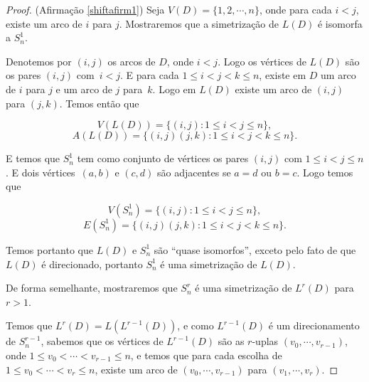 \begin{proof}(Afirmação \ref{shiftafirm1})
Seja $V(D) = \{1,2,\cdots, n\}$, onde para cada $i < j$, existe um arco de $i$ para $j$. Mostraremos que a simetrização de $L(D)$ é isomorfa a $S_n^1$.

Denotemos por $(i,j)$ os arcos de $D$, onde $i < j$. Logo os vértices de $L(D)$ são os pares $(i,j)$ com~$i < j$. E para cada $1 \leq i < j < k \leq n$, existe em $D$ um arco de $i$ para $j$ e um arco de $j$ para~$k$. Logo em $L(D)$ existe um arco de $(i,j)$ para $(j,k)$. Temos então que

\[V(L(D)) = \{(i,j) : 1\leq i < j \leq n\},\]
\[A(L(D)) = \{(i,j)(j,k) : 1\leq i <j<k\leq n\}.\]

E temos que $S_n^1$ tem como conjunto de vértices os pares $(i,j)$ com $1\leq i<j\leq n$. E dois vértices~$(a,b)$ e $(c,d)$ são adjacentes se $a = d$ ou $b = c$. Logo temos que

\[V(S_n^1) = \{(i,j) : 1\leq i<j\leq n\},\]
\[E(S_n^1) = \{(i,j)(j,k) : 1\leq i<j<k\leq n\}.\]

Temos portanto que $L(D)$ e $S_n^1$ são ``quase isomorfos'', exceto pelo fato de que $L(D)$ é direcionado, portanto $S_n^1$ é uma simetrização de $L(D)$.



De forma semelhante, mostraremos que $S_n^r$ é uma simetrização de $L^r(D)$ para $r>1$.

Temos que $L^r(D) = L(L^{r-1}(D))$, e como $L^{r-1}(D)$ é um direcionamento de $S_n^{r-1}$, sabemos que os vértices de $L^{r-1}(D)$ são as $r$-uplas $(v_0,\cdots,v_{r-1})$, onde $1\leq v_0 < \cdots < v_{r-1} \leq n$, e temos que para cada escolha de $1\leq v_0 < \cdots < v_{r} \leq n$, existe um arco de $(v_0,\cdots,v_{r-1})$ para $(v_1,\cdots,v_r)$.


\end{proof}

